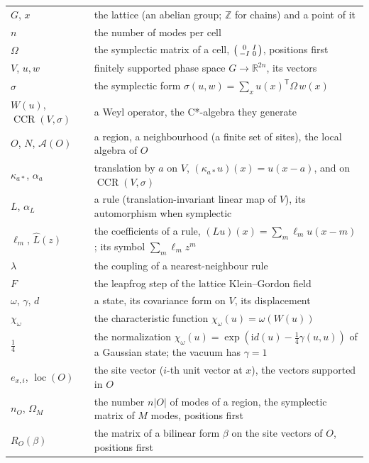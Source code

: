 \documentclass[11pt]{article}
\numberwithin{equation}{section}
\theoremstyle{definition}
\theoremstyle{remark}
\theoremstyle{plain}
\newcommand{\R}{\mathbb R}
\newcommand{\Z}{\mathbb Z}
\newcommand{\ii}{\mathrm i}
\newcommand{\cA}{\mathcal A}
\newcommand{\CCR}{\operatorname{CCR}}
\DeclareMathOperator{\loc}{loc}
\newcommand{\reve}[1]{#1}
\begin{document}
\begin{center}\small
\begin{tabular}{@{}l>{\raggedright\arraybackslash}p{}@{}}
$G$, $x$ & the lattice (an abelian group; $\Z$ for chains) and a point of it \\
$n$ & the number of modes per cell \\
$\Omega$ & the symplectic matrix of a cell, $\begin{psmallmatrix}0&I\\-I&0\end{psmallmatrix}$, positions first \\
$V$, $u,w$ & finitely supported phase space $G\to\R^{2n}$, its vectors \\
$\sigma$ & the symplectic form $\sigma(u,w)=\sum_x u(x)^{\mathsf T}\Omega\,w(x)$ \\
$W(u)$, $\CCR(V,\sigma)$ & a Weyl operator, the C*-algebra they generate \\
$O$, $N$, $\cA(O)$ & a region, a neighbourhood (a finite set of sites), the local algebra of $O$ \\
$\kappa_{a*}$, $\alpha_a$ & translation by $a$ on $V$, $(\kappa_{a*}u)(x)=u(x-a)$, and on $\CCR(V,\sigma)$ \\
$L$, $\alpha_L$ & a rule (translation-invariant linear map of $V$), its automorphism when symplectic \\
$\ell_m$, $\hat L(z)$ & the coefficients of a rule, $(Lu)(x)=\sum_m\ell_m u(x-m)$; its symbol $\sum_m\ell_m z^m$ \\
$\lambda$ & the coupling of a nearest-neighbour rule \\
$F$ & the leapfrog step of the lattice Klein--Gordon field \\
$\omega$, $\gamma$, $d$ & a state, its covariance form on $V$, its displacement \\
$\chi_\omega$ & the characteristic function $\chi_\omega(u)=\omega(W(u))$ \\
\reve{$\tfrac14$} & \reve{the normalization $\chi_\omega(u)=\exp(\ii d(u)-\tfrac14\gamma(u,u))$ of a Gaussian state; the vacuum has $\gamma=1$} \\
\reve{$e_{x,i}$, $\loc(O)$} & \reve{the site vector ($i$-th unit vector at $x$), the vectors supported in $O$} \\
\reve{$n_O$, $\Omega_M$} & \reve{the number $n|O|$ of modes of a region, the symplectic matrix of $M$ modes, positions first} \\
\reve{$R_O(\beta)$} & \reve{the matrix of a bilinear form $\beta$ on the site vectors of $O$, positions first} \\

\end{tabular}
\end{center}
\end{document}
